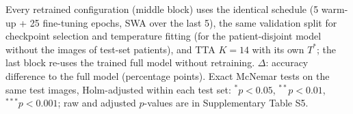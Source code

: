 Every retrained configuration (middle block) uses the identical schedule (5 warm-up + 25 fine-tuning epochs, SWA over the last 5), the same validation split for checkpoint selection and temperature fitting (for the patient-disjoint model without the images of test-set patients), and TTA $K{=}14$ with its own $T^{*}$; the last block re-uses the trained full model without retraining. $\Delta$: accuracy difference to the full model (percentage points). Exact McNemar tests on the same test images, Holm-adjusted within each test set: $^{*}p<0.05$, $^{**}p<0.01$, $^{***}p<0.001$; raw and adjusted $p$-values are in Supplementary Table S5.

